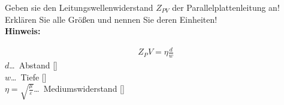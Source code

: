 \begin{question}[section=3,name={Wellenwiderstand},difficulty=,quantity=1,type=thr,tags={}]
	Geben sie den Leitungswellenwiderstand $Z_{PV}$ der Parallelplattenleitung an! Erklären Sie alle Größen und nennen Sie deren Einheiten!
	\\ \textbf{Hinweis:}\\
	
\end{question}
\begin{solution}
	\begin{align}
	Z_PV=\eta \frac{d}{w}
\end{align}
	$d$\dots\ Abstand [\metre]\\
	$w$\dots\ Tiefe [\metre]\\
	$\eta=\sqrt{\frac{\mu}{\varepsilon}}$\dots\ Mediumswiderstand [\ohm]
\end{solution}